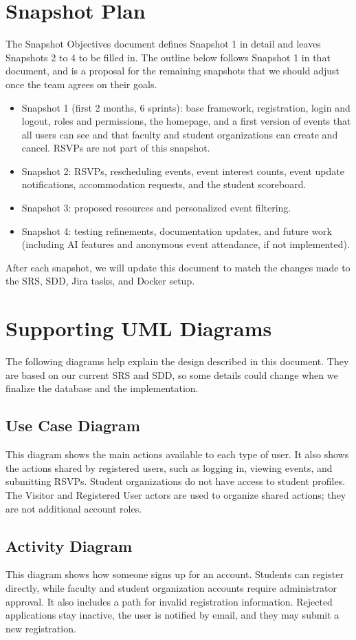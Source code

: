 \newpage %
\section{Snapshot Plan}
The Snapshot Objectives document defines Snapshot 1 in detail and leaves Snapshots 2 to 4 to be filled in. The outline below follows Snapshot 1 in that document, and is a proposal for the remaining snapshots that we should adjust once the team agrees on their goals.
\begin{itemize}
\item Snapshot 1 (first 2 months, 6 sprints): base framework, registration, login and logout, roles and permissions, the homepage, and a first version of events that all users can see and that faculty and student organizations can create and cancel. RSVPs are not part of this snapshot.
\item Snapshot 2: RSVPs, rescheduling events, event interest counts, event update notifications, accommodation requests, and the student scoreboard.
\item Snapshot 3: proposed resources and personalized event filtering.
\item Snapshot 4: testing refinements, documentation updates, and future work (including AI features and anonymous event attendance, if not implemented).
\end{itemize}
After each snapshot, we will update this document to match the changes made to the SRS, SDD, Jira tasks, and Docker setup.


\newpage %
\section{Supporting UML Diagrams}
The following diagrams help explain the design described in this document. They are based on our current SRS and SDD, so some details could change when we finalize the database and the implementation.

\subsection{Use Case Diagram}
This diagram shows the main actions available to each type of user. It also shows the actions shared by registered users, such as logging in, viewing events, and submitting RSVPs. Student organizations do not have access to student profiles. The Visitor and Registered User actors are used to organize shared actions; they are not additional account roles.

\subsection{Activity Diagram}
This diagram shows how someone signs up for an account. Students can register directly, while faculty and student organization accounts require administrator approval. It also includes a path for invalid registration information. Rejected applications stay inactive, the user is notified by email, and they may submit a new registration.

